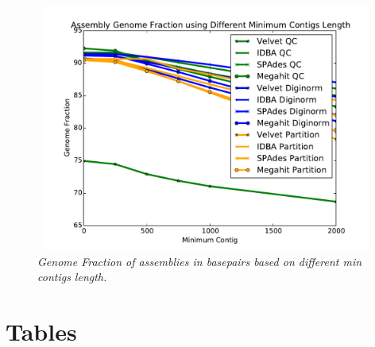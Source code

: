 \begin{figure} [h] 
\begin{center}  
 
\includegraphics[height=3.2in,width=4.5in]{genome-fraction-contigs.pdf}  
\caption{\small \sl Genome Fraction of assemblies in basepairs based on different min contigs length.\label{fig:gf}}  
\end{center}  
\end{figure}  

\section*{Tables}
% 
%
%







